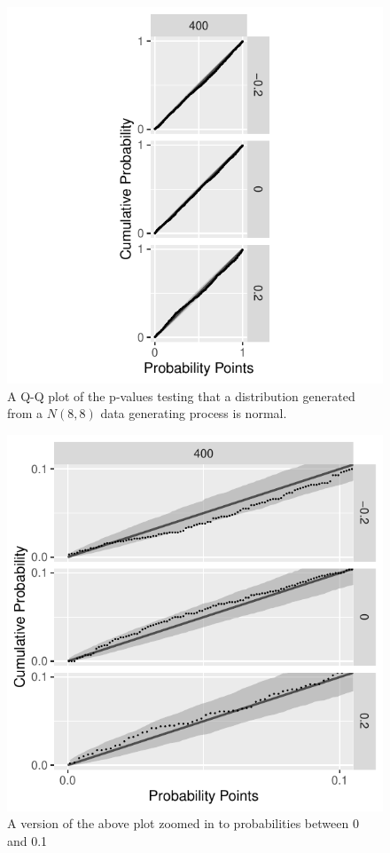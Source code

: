 \documentclass[12pt, letterpaper]{article}
\begin{document}
\begin{figure}[tbp]
  \centering
  \includegraphics[scale=1]{figures/normal}
  \caption{A Q-Q plot of the p-values testing that a distribution
  generated from a $N(8,8)$ data generating process is normal.}
  \label{fig:mu}
\end{figure}

\begin{figure}[tbp]
  \centering
  \includegraphics[scale=1]{figures/zoom_normal}
  \caption{A version of the above plot zoomed in to probabilities between 0 and
  0.1}
  \label{fig:mu}
\end{figure}
\end{document}
